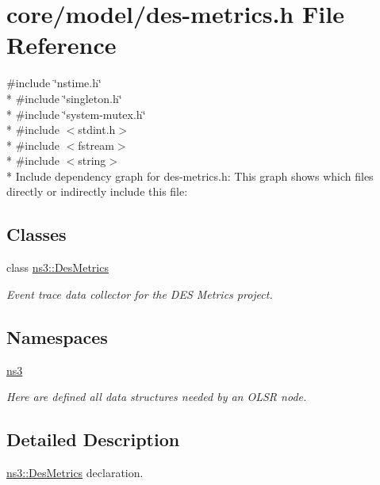\hypertarget{des-metrics_8h}{}\section{core/model/des-\/metrics.h File Reference}
\label{des-metrics_8h}
{\ttfamily \#include \char`\"{}nstime.\+h\char`\"{}}\\*
{\ttfamily \#include \char`\"{}singleton.\+h\char`\"{}}\\*
{\ttfamily \#include \char`\"{}system-\/mutex.\+h\char`\"{}}\\*
{\ttfamily \#include $<$stdint.\+h$>$}\\*
{\ttfamily \#include $<$fstream$>$}\\*
{\ttfamily \#include $<$string$>$}\\*
Include dependency graph for des-\/metrics.h\+:
This graph shows which files directly or indirectly include this file\+:
\subsection*{Classes}
\begin{DoxyCompactItemize}
\item 
class \hyperlink{classns3_1_1DesMetrics}{ns3\+::\+Des\+Metrics}
\begin{DoxyCompactList}\small\item\em Event trace data collector for the D\+ES Metrics project. \end{DoxyCompactList}\end{DoxyCompactItemize}
\subsection*{Namespaces}
\begin{DoxyCompactItemize}
\item 
 \hyperlink{namespacens3}{ns3}
\begin{DoxyCompactList}\small\item\em Here are defined all data structures needed by an O\+L\+SR node. \end{DoxyCompactList}\end{DoxyCompactItemize}


\subsection{Detailed Description}
\hyperlink{classns3_1_1DesMetrics}{ns3\+::\+Des\+Metrics} declaration. 